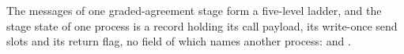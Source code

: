 \begin{definition}
  \label{def:aba-gbca-vocab}
  \leanok
  The messages of one graded-agreement stage form a five-level ladder, and the stage state of one process is a record holding its call payload, its write-once send slots and its return flag, no field of which names another process:  and .
\end{definition}

